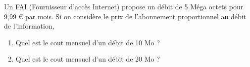 
Un FAI (Fournisseur d'accès Internet) propose un débit de 5 Méga octets pour 9,99 € par mois. Si on considère le prix de l'abonnement proportionnel au débit de l'information,  
\begin{enumerate}
\item Quel est le cout mensuel d'un débit de 10 Mo ?
\item Quel est le cout mensuel d'un débit de 20 Mo ?
\end{enumerate}
